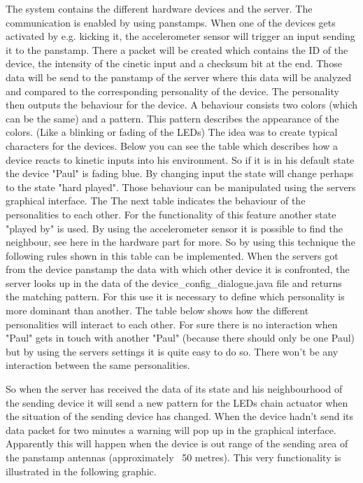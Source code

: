 The system contains the different hardware devices and the server. The communication is enabled by using panstamps. When one of the devices gets activated by e.g. kicking it, the accelerometer sensor will trigger an input sending it to the panstamp. There a packet will be created which contains the ID of the device, the intensity of the cinetic input and a checksum bit at the end.
Those data will be send to the panstamp of the server where this data will be analyzed and compared to the corresponding personality of the device. The personality then outputs the behaviour for the device. A behaviour consists two colors (which can be the same) and a pattern. This pattern describes the appearance of the colors. (Like a blinking or fading of the LEDs)
The idea was to create typical characters for the devices. Below you can see the table which describes how a device reacts to kinetic inputs into his environment. So if it is in his default state the device "Paul" is fading blue. By changing input the state will change perhaps to the state "hard played". Those behaviour can be manipulated using the servers graphical interface. The %
The next table indicates the behaviour of the personalities to each other. For the functionality of this feature another state "played by" is used. By using the accelerometer sensor it is possible to find the neighbour, see here in the hardware part for more.
So by using this technique the following rules shown in this table can be implemented.
When the servers got from the device panstamp the data with which other device it is confronted, the server looks up in the data of the device_config_dialogue.java file and returns the matching pattern. For this use it is necessary to define which personality is more dominant than another.
The table below shows how the different personalities will interact to each other.
For sure there is no interaction when "Paul" gets in touch with another "Paul" (because there should only be one Paul) but by using the servers settings it is quite easy to do so. There won't be any interaction between the same personalities.

So when the server has received the data of its state and his neighbourhood of the sending device it will send a new pattern for the LEDs chain actuator when the situation of the sending device has changed.
When the device hadn't send its data packet for two minutes a warning will pop up in the graphical interface. Apparently this will happen when the device is out range of the sending area of the panstamp antennas (approximately ~50 metres).
This very functionality is illustrated in the following graphic.
 
